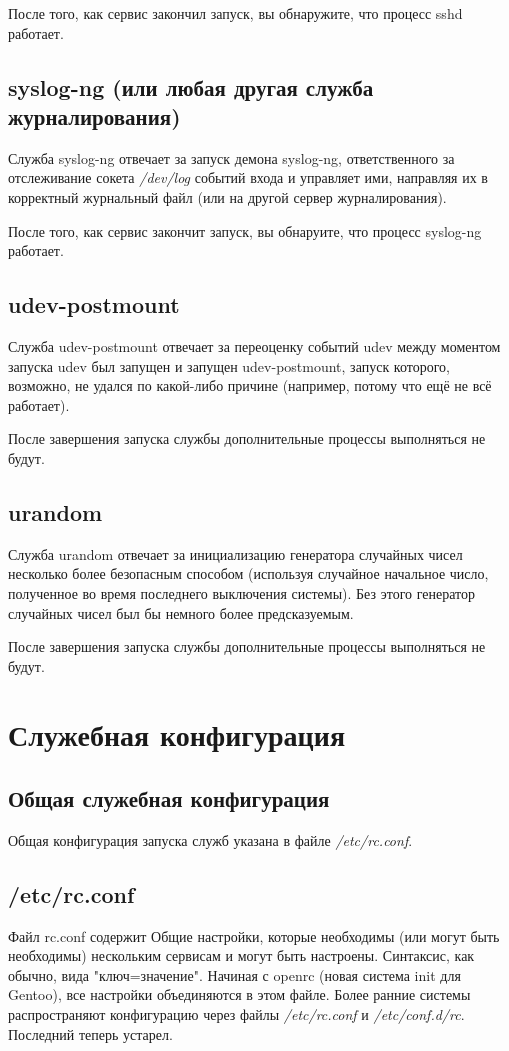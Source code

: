 \documentclass[10pt]{book}
\begin{document}
После того, как сервис закончил запуск, вы обнаружите, что процесс sshd работает.

\subsection{syslog-ng (или любая другая служба журналирования)}
Служба syslog-ng отвечает за запуск демона syslog-ng, ответственного за отслеживание сокета \textit{/dev/log} событий входа и управляет ими, направляя их в корректный журнальный файл (или на другой сервер журналирования).

После того, как сервис закончит запуск, вы обнаруите, что процесс syslog-ng работает.

\subsection{udev-postmount}
Служба udev-postmount отвечает за переоценку событий udev между моментом запуска udev был запущен и запущен udev-postmount, запуск которого, возможно, не удался по какой-либо причине (например, потому что ещё не всё работает).

После завершения запуска службы дополнительные процессы выполняться не будут.

\subsection{urandom}
Служба urandom отвечает за инициализацию генератора случайных чисел несколько более безопасным способом (используя случайное начальное число, полученное во время последнего выключения системы). Без этого генератор случайных чисел был бы немного более предсказуемым.

После завершения запуска службы дополнительные процессы выполняться не будут.

\section{Служебная конфигурация}
\subsection{Общая служебная конфигурация}

Общая конфигурация запуска служб указана в файле \textit{/etc/rc.conf}.

\subsection{/etc/rc.conf}
Файл rc.conf содержит Общие настройки, которые необходимы (или могут быть необходимы) нескольким сервисам и могут быть настроены. Синтаксис, как обычно, вида "ключ=значение"{}. Начиная с openrc (новая система init для Gentoo), все настройки объединяются в этом файле. Более ранние системы распространяют конфигурацию через файлы \textit{/etc/rc.conf} и \textit{/etc/conf.d/rc}. Последний теперь устарел.
\end{document}
